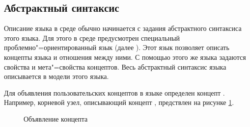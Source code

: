 \subsection{Абстрактный синтаксис}
Описание языка в среде \MPS{} обычно начинается с задания абстрактного синтаксиса \cite{redDragon} этого языка. Для этого в
среде \MPS{} предусмотрен специальный проблемно"=ориентированный язык  (далее
). Этот язык позволяет описать концепты языка и отношения между ними. С помощью этого же языка
задаются свойства и мета"=свойства концептов. Весь абстрактный синтаксис языка описывается в модели  этого
языка.

Для объявления пользовательских концептов в языке  определен концепт .
Например, корневой узел, описывающий концепт , предствлен на рисунке \ref{fig:StateMachineConcept}.

\begin{figure}
\centering
{}
\caption{Объявление концепта }
\label{fig:StateMachineConcept}
\end{figure}


